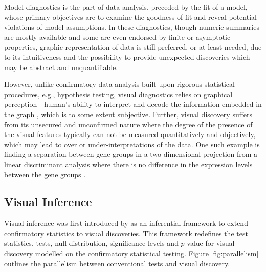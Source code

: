 \documentclass{monashthesis}
\begin{document}
Model diagnostics is the part of data analysis, preceded by the fit of a model, whose primary objectives are to examine the goodness of fit and reveal potential violations of model assumptions.
In these diagnostics, though numeric summaries are mostly available and some are even endorsed by finite or asymptotic properties, graphic representation of data is still preferred, or at least needed, due to its intuitiveness and the possibility to provide unexpected discoveries which may be abstract and
unquantifiable.

However, unlike confirmatory data analysis built upon rigorous statistical procedures, e.g., hypothesis testing, visual diagnostics relies on graphical perception - human's ability to interpret and decode the information embedded in the graph \autocite{cleveland_graphical_1984}, which is to some extent subjective. Further, visual discovery suffers from its unsecured and unconfirmed nature where the degree of the presence of the visual features typically can not be measured quantitatively and objectively, which may lead to over or under-interpretations of the data. One such example is finding a separation between gene groups in a two-dimensional projection from a linear discriminant analysis where there is no difference in the expression levels between the gene groups \autocite{roy_chowdhury_using_2015}.

\hypertarget{visual-inference}{%
\subsection{Visual Inference}\label{visual-inference}}

Visual inference was first introduced by \textcite{buja_statistical_2009} as an inferential framework to extend confirmatory statistics to visual discoveries. This framework redefines the test statistics, tests, null distribution, significance levels and \(p\)-value for visual discovery modelled on the confirmatory statistical testing. Figure \ref{fig:parallelism} outlines the parallelism between conventional tests and visual discovery.
\end{document}
